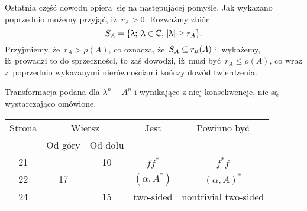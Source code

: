 \documentclass[a4paper,11pt]{article}
\begin{document}
Ostatnia część dowodu opiera~się na następującej pomyśle. Jak wykazano
poprzednio możemy przyjąć, iż~$r_{ A } > 0$. Rozważmy zbiór
\begin{equation}
  \label{eq:Bratteli-Robinson-Operator-Algebras-ETC-Vol-I-s01-01}
  S_{ A } =
  \{ \uplambda; \; \uplambda \in \mathbb{C}, \, | \uplambda | \geq r_{ A } \}.
\end{equation}
Przyjmiemy, że~$r_{ A } > \rho( A )$, co oznacza, że~$S_{ A } \subseteq r_{ \mathfrak{U} }( A )$
i~wykażemy, iż~prowadzi to do sprzeczności, to zaś dowodzi, iż~musi
być~$r_{ A } \leq \rho( A )$, co wraz z~poprzednio wykazanymi nierównościami
kończy dowód twierdzenia.











\vspace{\VerSpaceFour}





\noindent
{} Transformacja podana dla $\lambda^{ n } - A^{ n }$ i
wynikające z niej konsekwencje, nie są wystarczająco omówione.

\vspace{\VerSpaceFour}






\newpage



\begin{center}
  \begin{tabular}{|c|c|c|c|c|}
    \hline
    Strona & \multicolumn{2}{c|}{Wiersz} & Jest
                              & Powinno być \\ \cline{2-3}
    & Od góry & Od dołu & & \\
    \hline
    21  & & 10 & $f f^{ * }$ & $f^{ * } f$ \\
    22  & 17 & & $( \alpha, A^{ * } )$ & $( \alpha, A )^{ * }$ \\
    24 & & 15 & two-sided & nontrivial two-sided \\
    \hline
  \end{tabular}

\end{center}
\end{document}
